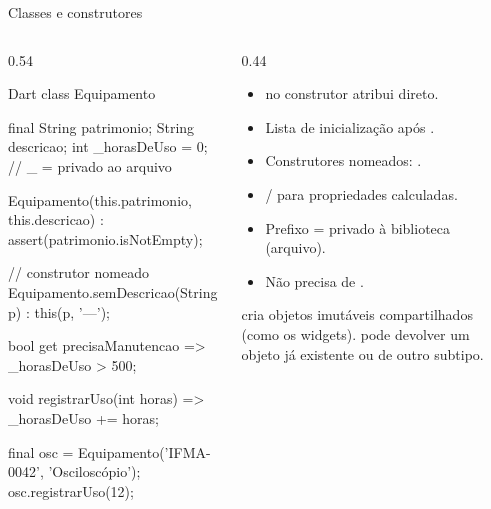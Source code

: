 \documentclass[aspectratio=169,10pt]{beamer}
\begin{document}
\begin{frame}[fragile]{Classes e construtores}
  \begin{columns}[T]
    \begin{column}{0.54\textwidth}
\begin{codigo}[title=equipamento.dart]{Dart}
class Equipamento {
  final String patrimonio;
  String descricao;
  int _horasDeUso = 0;          // _ = privado ao arquivo

  Equipamento(this.patrimonio, this.descricao)
      : assert(patrimonio.isNotEmpty);

  // construtor nomeado
  Equipamento.semDescricao(String p) : this(p, '---');

  bool get precisaManutencao => _horasDeUso > 500;

  void registrarUso(int horas) => _horasDeUso += horas;
}

final osc = Equipamento('IFMA-0042', 'Osciloscópio');
osc.registrarUso(12);
\end{codigo}
    \end{column}
    \begin{column}{0.44\textwidth}
      \begin{itemize}
        \item {} no construtor atribui direto.
        \item Lista de inicialização após \cod{:}.
        \item Construtores nomeados: .
        \item {}/ para propriedades calculadas.
        \item Prefixo \cod{\_} = privado à biblioteca (arquivo).
        \item Não precisa de .
      \end{itemize}
      \begin{dica}
         cria objetos imutáveis compartilhados (como os widgets).  pode devolver um objeto já existente ou de outro subtipo.
      \end{dica}
    \end{column}
  \end{columns}
\end{frame}
\end{document}
